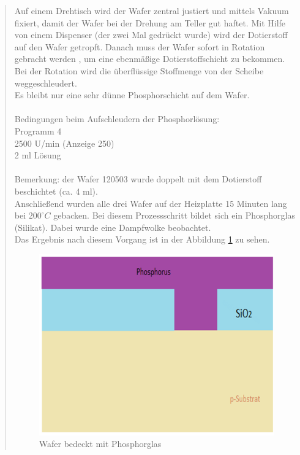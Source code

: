\begin{quote}
 		Auf einem Drehtisch wird der Wafer zentral justiert und mittels Vakuum
 		fixiert, damit der Wafer bei der Drehung am Teller gut haftet. Mit Hilfe
 		von einem Dispenser (der zwei Mal gedrückt wurde) wird der Dotierstoff auf den
 		Wafer getropft. Danach muss der Wafer sofort in Rotation gebracht werden
 		, um eine ebenmäßige Dotierstoffschicht zu bekommen. Bei der Rotation
 		wird die überflüssige Stoffmenge von der Scheibe weggeschleudert.\\
		Es bleibt nur eine sehr dünne Phosphorschicht auf dem Wafer.\\
		\\
		Bedingungen beim Aufschleudern der Phosphorlösung:\\
		Programm 4\\
		2500 U/min (Anzeige 250)\\
		2 ml Lösung\\
		\\
		Bemerkung: der Wafer 120503 wurde doppelt mit dem Dotierstoff
		beschichtet (ca. 4 ml).\\
		Anschließend wurden alle drei Wafer auf der Heizplatte  15 Minuten lang
		bei $200^{\circ}C$ gebacken. Bei diesem Prozessschritt bildet sich ein
		Phosphorglas (Silikat). Dabei wurde eine Dampfwolke beobachtet. \\
		Das Ergebnis nach diesem Vorgang ist in der Abbildung \ref{fig:Waf_phos}
		zu sehen.\\

        \vspace{2em}

    		\begin{figure}[H]
				\hspace{4.7 cm}
                \includegraphics[scale=0.5, trim = 0cm 0cm 0cm 0cm,clip]
                	{./HerstellungBilder/StrukturmitPhosphorus.png}
                  \caption{Wafer bedeckt mit Phosphorglas}
                \label{fig:Waf_phos}
            \end{figure}


\end{quote}
